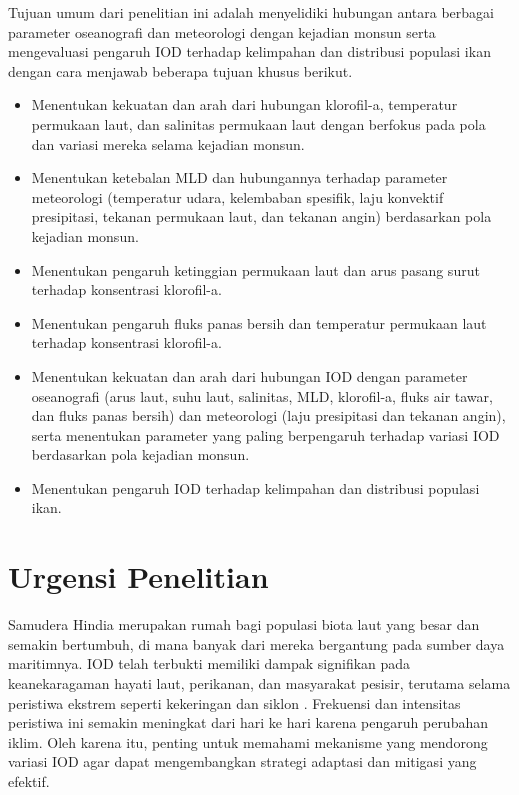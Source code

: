 \begin{spacing}{1.5}
	Tujuan umum dari penelitian ini adalah menyelidiki hubungan antara berbagai parameter oseanografi dan meteorologi dengan kejadian monsun serta mengevaluasi pengaruh IOD terhadap kelimpahan dan distribusi populasi ikan dengan cara menjawab beberapa tujuan khusus berikut.
	
	\begin{itemize}
		\item  Menentukan kekuatan dan arah dari hubungan klorofil-a, temperatur permukaan laut, dan salinitas permukaan laut dengan berfokus pada pola dan variasi mereka selama kejadian monsun.
		
		\item Menentukan ketebalan MLD dan hubungannya terhadap parameter meteorologi (temperatur udara, kelembaban spesifik, laju konvektif presipitasi, tekanan permukaan laut, dan tekanan angin) berdasarkan pola kejadian monsun.
		
		\item Menentukan pengaruh ketinggian permukaan laut dan arus pasang surut terhadap konsentrasi klorofil-a.
		
		\item Menentukan pengaruh fluks panas bersih dan temperatur permukaan laut terhadap konsentrasi klorofil-a.
		
		\item Menentukan kekuatan dan arah dari hubungan IOD dengan parameter oseanografi (arus laut, suhu laut, salinitas, MLD, klorofil-a, fluks air tawar, dan fluks panas bersih) dan meteorologi (laju presipitasi dan tekanan angin), serta menentukan parameter yang paling berpengaruh terhadap variasi IOD berdasarkan pola kejadian monsun.
		
		\item Menentukan pengaruh IOD terhadap kelimpahan dan distribusi populasi ikan.
		
	\end{itemize}
	\section[Urgensi Penelitian]{Urgensi Penelitian}

	Samudera Hindia merupakan rumah bagi populasi biota laut yang besar dan semakin bertumbuh, di mana banyak dari mereka bergantung pada sumber daya maritimnya. IOD telah terbukti memiliki dampak signifikan pada keanekaragaman hayati laut, perikanan, dan masyarakat pesisir, terutama selama peristiwa ekstrem seperti kekeringan \cite{Pan2018} dan siklon \cite{Wahiduzzaman2022}. Frekuensi dan intensitas peristiwa ini semakin meningkat dari hari ke hari karena pengaruh perubahan iklim. Oleh karena itu, penting untuk memahami mekanisme yang mendorong variasi IOD agar dapat mengembangkan strategi adaptasi dan mitigasi yang efektif.
	

\end{spacing}
